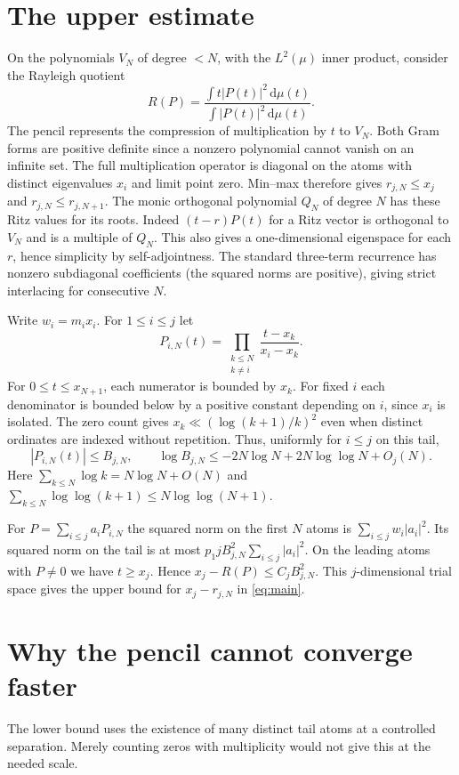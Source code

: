 \documentclass[11pt]{article}
\newcommand{\dd}{\,\mathrm d}
\begin{document}
\section{The upper estimate}
On the polynomials $V_N$ of degree $<N$, with the $L^2(\mu)$ inner product, consider the Rayleigh quotient
\[
 R(P)=\frac{\int t|P(t)|^2\dd\mu(t)}{\int|P(t)|^2\dd\mu(t)}.
\]
The pencil represents the compression of multiplication by $t$ to $V_N$. Both Gram forms are positive definite since a nonzero polynomial cannot vanish on an infinite set. The full multiplication operator is diagonal on the atoms with distinct eigenvalues $x_i$ and limit point zero. Min--max therefore gives $r_{j,N}\le x_j$ and $r_{j,N}\le r_{j,N+1}$. The monic orthogonal polynomial $Q_N$ of degree $N$ has these Ritz values for its roots. Indeed $(t-r)P(t)$ for a Ritz vector is orthogonal to $V_N$ and is a multiple of $Q_N$. This also gives a one-dimensional eigenspace for each $r$, hence simplicity by self-adjointness. The standard three-term recurrence has nonzero subdiagonal coefficients (the squared norms are positive), giving strict interlacing for consecutive $N$.

Write $w_i=m_i x_i$. For $1\le i\le j$ let
\[
 P_{i,N}(t)=\prod_{\substack{k\le N\\ k\ne i}}\frac{t-x_k}{x_i-x_k}.
\]
For $0\le t\le x_{N+1}$, each numerator is bounded by $x_k$. For fixed $i$ each denominator is bounded below by a positive constant depending on $i$, since $x_i$ is isolated. The zero count gives $x_k\ll (\log(k+1)/k)^2$ even when distinct ordinates are indexed without repetition. Thus, uniformly for $i\le j$ on this tail,
\begin{equation}
 |P_{i,N}(t)|\le B_{j,N},\qquad
 \log B_{j,N}\le -2N\log N+2N\log\log N+O_j(N).
 \label{eq:B}
\end{equation}
Here $\sum_{k\le N}\log k= N\log N+O(N)$ and $\sum_{k\le N}\log\log(k+1)\le N\log\log(N+1)$.

For $P=\sum_{i\le j} a_i P_{i,N}$ the squared norm on the first $N$ atoms is $\sum_{i\le j}w_i |a_i|^2$. Its squared norm on the tail is at most $p_1 j B_{j,N}^2\sum_{i\le j}|a_i|^2$. On the leading atoms with $P\ne0$ we have $t\ge x_j$. Hence $x_j-R(P)\le C_j B_{j,N}^2$. This $j$-dimensional trial space gives the upper bound for $x_j-r_{j,N}$ in \eqref{eq:main}.

\section{Why the pencil cannot converge faster}
The lower bound uses the existence of many distinct tail atoms at a controlled separation. Merely counting zeros with multiplicity would not give this at the needed scale.
\end{document}
